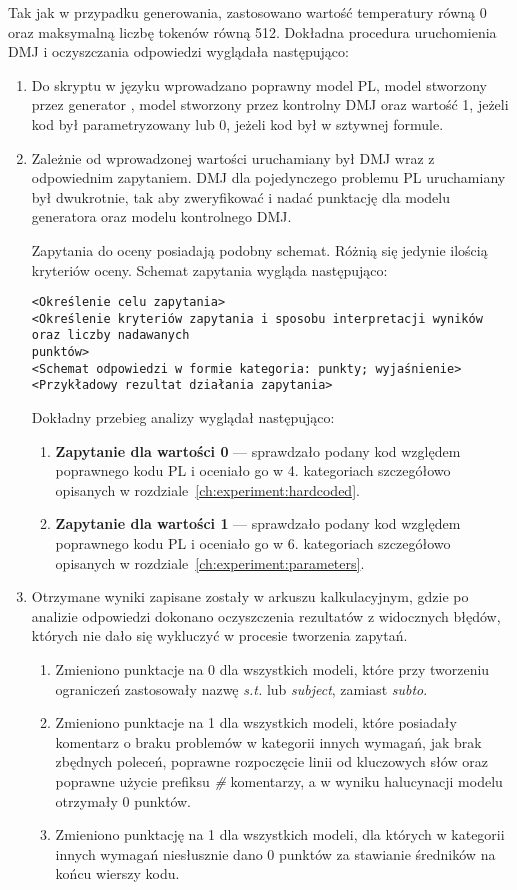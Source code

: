Tak jak w przypadku generowania, zastosowano wartość temperatury równą 0 oraz maksymalną liczbę tokenów równą 512. Dokładna procedura uruchomienia DMJ i oczyszczania odpowiedzi wyglądała następująco:

\begin{enumerate}
\item Do skryptu w języku  wprowadzano poprawny model PL, model stworzony przez generator , model stworzony przez kontrolny DMJ oraz wartość 1, jeżeli kod był parametryzowany lub 0, jeżeli kod był w sztywnej formule.
\item Zależnie od wprowadzonej wartości uruchamiany był DMJ wraz z odpowiednim zapytaniem. DMJ dla pojedynczego problemu PL uruchamiany był dwukrotnie, tak aby zweryfikować i nadać punktację dla modelu generatora oraz modelu kontrolnego DMJ.

Zapytania do oceny posiadają podobny schemat. Różnią się jedynie ilością kryteriów oceny. Schemat zapytania wygląda następująco:

\begin{lstlisting}[language=zimpl]
<Określenie celu zapytania>
<Określenie kryteriów zapytania i sposobu interpretacji wyników oraz liczby nadawanych
punktów>
<Schemat odpowiedzi w formie kategoria: punkty; wyjaśnienie>
<Przykładowy rezultat działania zapytania>
\end{lstlisting}

Dokładny przebieg analizy wyglądał następująco:

\begin{enumerate}
\item \textbf{Zapytanie dla wartości 0} --- sprawdzało podany kod względem poprawnego kodu PL i oceniało go w 4. kategoriach szczegółowo opisanych w rozdziale~\ref{ch:experiment:hardcoded}.
\item \textbf{Zapytanie dla wartości 1} --- sprawdzało podany kod względem poprawnego kodu PL i oceniało go w 6. kategoriach szczegółowo opisanych w rozdziale~\ref{ch:experiment:parameters}.
\end{enumerate}
\item Otrzymane wyniki zapisane zostały w arkuszu kalkulacyjnym, gdzie po analizie odpowiedzi dokonano oczyszczenia rezultatów z widocznych błędów, których nie dało się wykluczyć w procesie tworzenia zapytań.
\begin{enumerate}
\item Zmieniono punktacje na 0 dla wszystkich modeli, które przy tworzeniu ograniczeń zastosowały nazwę \textit{s.t.} lub \textit{subject}, zamiast \textit{subto}.
\item Zmieniono punktacje na 1 dla wszystkich modeli, które posiadały komentarz o braku problemów w kategorii innych wymagań, jak brak zbędnych poleceń, poprawne rozpoczęcie linii od kluczowych słów oraz poprawne użycie prefiksu \textit{\#} komentarzy, a w wyniku halucynacji modelu otrzymały 0 punktów.
\item Zmieniono punktację na 1 dla wszystkich modeli, dla których w kategorii innych wymagań niesłusznie dano 0 punktów za stawianie średników na końcu wierszy kodu.
\end{enumerate}
\end{enumerate}

